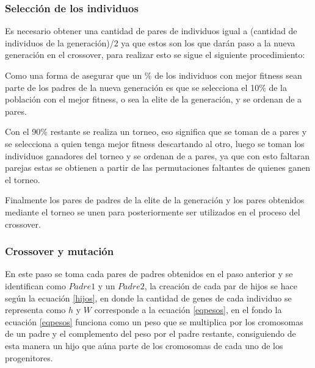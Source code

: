 \documentclass[12pt]{article}
\begin{document}



\subsubsection{Selección de los individuos}

Es necesario obtener una cantidad de pares de individuos igual a (cantidad de individuos de la generación)/2 ya que estos son los que darán paso a la nueva generación en el crossover, para realizar esto se sigue el siguiente procedimiento:

Como una forma de asegurar que un \% de los individuos con mejor fitness sean parte de los padres de la nueva generación es que se selecciona el 10\% de la población con el mejor fitness, o sea la elite de la generación, y se ordenan de a pares.

Con el 90\% restante se realiza un torneo, eso significa que se toman de a pares y se selecciona a quien tenga mejor fitness descartando al otro, luego se toman los individuos ganadores del torneo y se ordenan de a pares, ya que con esto faltaran parejas estas se obtienen a partir de las permutaciones faltantes de quienes ganen el torneo.

Finalmente los pares de padres de la elite de la generación y los pares obtenidos mediante el torneo se unen para posteriormente ser utilizados en el proceso del crossover.


\subsubsection{Crossover y mutación}

En este paso se toma cada pares de padres obtenidos en el paso anterior y se identifican como $Padre1$ y un $Padre2$, la creación de cada par de hijos se hace según la ecuación \eqref{hijos}, en donde la cantidad de genes de cada individuo se representa como $h$ y $W$ corresponde a la ecuación \eqref{eqpesos}, en el fondo la ecuación \eqref{eqpesos} funciona como un peso que se multiplica por los cromosomas de un padre y el complemento del peso por el padre restante, consiguiendo de esta manera un hijo que aúna parte de los cromosomas de cada uno de los progenitores.
\end{document}
